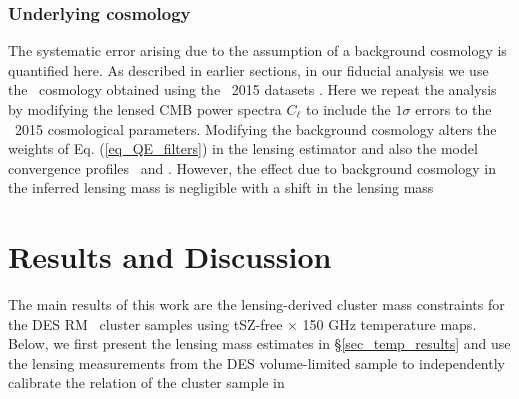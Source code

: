 \subsubsection{Underlying cosmology}\label{subsec_others}
The systematic error arising due to the assumption of a background cosmology is quantified here.
As described in earlier sections, in our fiducial analysis we use the \lcdm\ cosmology obtained using the \planck\ 2015 datasets \citep{planck15-13}. 
Here we repeat the analysis by modifying the lensed CMB power spectra $C_{\ell}$ to include the $1\sigma$ errors to the \planck\ 2015 cosmological parameters.
Modifying the background cosmology alters the weights of Eq. (\ref{eq_QE_filters}) in the lensing estimator and also the model convergence profiles \kappaonehalomz\ and \kappatwohalomz. 
However, the effect due to background cosmology in the inferred lensing mass is negligible with a shift in the lensing mass %

  \section{Results and Discussion}\label{sec_results}

The main results of this work are the lensing-derived cluster mass constraints for the DES RM \whichyear\ cluster samples using \sptpol{} tSZ-free $\times$ 150 GHz temperature maps.
Below, we first present the lensing mass estimates in \S\ref{sec_temp_results} and use the lensing measurements from the DES \whichyear{} volume-limited sample to independently calibrate the \ML{} relation of the cluster sample in %
